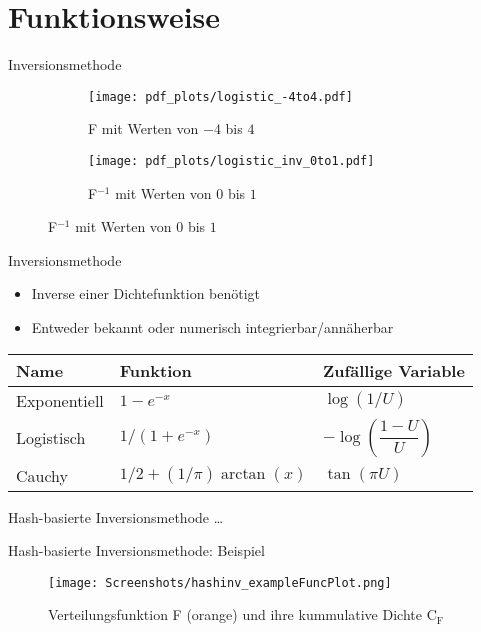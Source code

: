 \section{Funktionsweise}

\begin{frame}{Inversionsmethode}
	\begin{figure}
		\begin{subfigure}{.45\textwidth}
			\centering
			\texttt{[image: pdf\_plots/logistic\_-4to4.pdf]}
            \caption{F mit Werten von $-4$ bis $4$}
		\end{subfigure}
		\begin{subfigure}{.45\textwidth}
			\centering
			\texttt{[image: pdf\_plots/logistic\_inv\_0to1.pdf]}
            \caption{F$^{-1}$ mit Werten von $0$ bis $1$}
		\end{subfigure}
	\end{figure}
\end{frame}

\begin{frame}{Inversionsmethode}
    \begin{itemize}
        \item Inverse einer Dichtefunktion benötigt 
        \item Entweder bekannt %
            oder numerisch integrierbar/annäherbar
    \end{itemize}
    \begin{table}%
        \centering
        \begin{tabular}{l|l|l}
            Name         & Funktion & Zufällige Variable \\
            \hline\hline %
            Exponentiell & $1 - e^{-x}$ & $\log(1/U)$ \\ %
            Logistisch   & $1 / (1 + e^{-x})$ & $-\log(\dfrac{1-U}{U})$ \\ %
            Cauchy       & $1/2 + (1/\pi) \arctan(x)$ & $\tan(\pi U)$
        \end{tabular}
        \label{tab:invFunctions}
    \end{table}
\end{frame}

\begin{frame}{Hash-basierte Inversionsmethode}
    \dots
\end{frame}

\begin{frame}{Hash-basierte Inversionsmethode: Beispiel}
    \begin{figure}
        \centering
		\texttt{[image: Screenshots/hashinv\_exampleFuncPlot.png]}
        \caption{Verteilungsfunktion F (orange) und ihre kummulative Dichte $\mathrm{C_F}$}
    \end{figure}
\end{frame}

